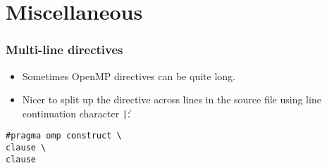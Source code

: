 \documentclass{beamer}
\begin{document}
\section{Miscellaneous}
%
%
%
%
%
\begin{frame}[fragile]
\frametitle{Multi-line directives}
\begin{itemize}
  \item Sometimes OpenMP directives can be quite long.
  \item Nicer to split up the directive across lines in the source file using line continuation character \texttt|\|:
\end{itemize}

\begin{verbatim}
#pragma omp construct \
clause \
clause
\end{verbatim}

\end{frame}
\end{document}
